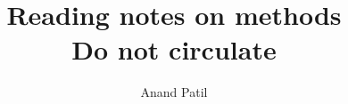 \documentclass[a4paper]{article}
\begin{document}
\title{Reading notes on methods\\ Do not circulate}
\author{Anand Patil}
\maketitle

\tableofcontents 




\nocite{*} 

 
 
\end{document}
